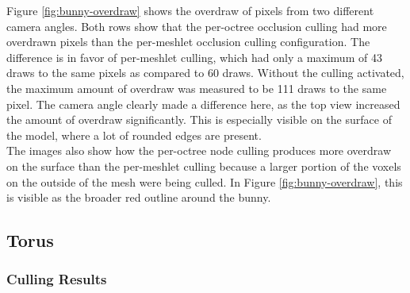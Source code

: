 \noindent
Figure \ref{fig:bunny-overdraw} shows the overdraw of pixels from two different camera angles.
Both rows show that the per-octree occlusion culling had more overdrawn pixels than the 
per-meshlet occlusion culling configuration. The difference is in favor of per-meshlet 
culling, which had only a maximum of 43 draws to the same pixels as compared to 60 draws. Without 
the culling activated, the maximum amount of overdraw was measured to be 111 draws to the same pixel.
The camera angle clearly made a difference here, as the top view increased the amount of 
overdraw significantly. This is especially visible on the surface of the model, where a lot 
of rounded edges are present. \\

\noindent
The images also show how the per-octree node culling produces more overdraw on the surface than the 
per-meshlet culling because a larger portion of the voxels on the outside of the mesh were being 
culled. In Figure \ref{fig:bunny-overdraw}, this is visible as the broader red outline around the 
bunny.

\clearpage




\subsection*{Torus}

\subsubsection*{Culling Results} \label{subsubsec-culling-results-torus}


